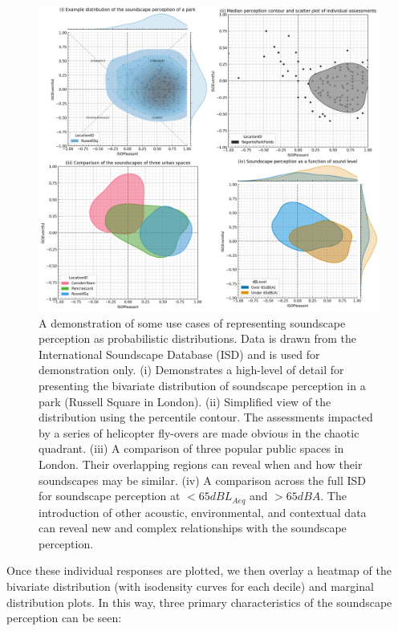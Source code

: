 \begin{figure}
  \centering
  \includegraphics[width=\textwidth]{Figures/jasa-el_Figure2.png}
  \caption{\linespread{1}\selectfont{} A demonstration of some use cases of representing soundscape perception as probabilistic distributions. Data is drawn from the International Soundscape Database (ISD) and is used for demonstration only. (i) Demonstrates a high-level of detail for presenting the bivariate distribution of soundscape perception in a park (Russell Square in London). (ii) Simplified view of the distribution using the  percentile contour. The assessments impacted by a series of helicopter fly-overs are made obvious in the chaotic quadrant. (iii) A comparison of three popular public spaces in London. Their overlapping regions can reveal when and how their soundscapes may be similar. (iv) A comparison across the full ISD for soundscape perception at $<65 dB L_{Aeq}$ and $> 65 dBA$. The introduction of other acoustic, environmental, and contextual data can reveal new and complex relationships with the soundscape perception. \label{fig:circ}}
\end{figure}

Once these individual responses are plotted, we then overlay a heatmap of the bivariate distribution (with isodensity curves for each decile) and marginal distribution plots. In this way, three primary characteristics of the soundscape perception can be seen:

